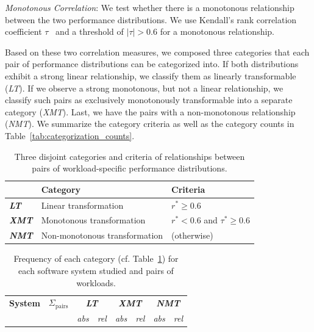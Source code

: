 {\begin{compactenum}
	\item \textit{Monotonous Correlation}: We test whether there is a monotonous relationship between the two performance distributions. We use Kendall's rank correlation coefficient $\tau$~\cite{kendall1938new} and a threshold of  $\vert\tau\vert > 0.6$ for a monotonous relationship.
\end{compactenum}
{\color{black}Based on these two correlation measures, we composed three categories that each pair of performance distributions can be categorized into.
If both distributions exhibit a strong linear relationship, we classify them as linearly transformable (\textit{\colorbox{lt-color!60}{LT}}). If we observe a strong monotonous, but not a linear relationship, we classify such pairs as exclusively monotonously transformable into a separate category (\textit{\colorbox{xmt-color!60}{XMT}}). Last, we have the pairs with a non-monotonous relationship  (\textit{\colorbox{nmt-color!60}{NMT}}). 
We summarize the category criteria as well as the category counts in Table~\ref{tab:categorization_counts}. 

\begin{table}
	\footnotesize
	\caption{Three disjoint categories and criteria of relationships between pairs of workload-specific performance distributions.}
	\centering
\begin{tabular}{lp{4.1cm}p{2.8cm}}	
	\toprule
	 \textbf{} & \textbf{Category} & \textbf{Criteria}\\
	 \midrule
	 \rowcolor{lt-color!40!white}\cellcolor{lt-color}\textit{\textbf{LT}} & {Linear transformation} & $r^* \geq 0.6$ \\
	\rowcolor{xmt-color!40!white}\cellcolor{xmt-color}\textit{\textbf{XMT}} & {Monotonous transformation} & $r^* < 0.6 $ and $ \tau^* \geq 0.6$ \\
	\rowcolor{nmt-color!40!white}\cellcolor{nmt-color}\textit{\textbf{NMT}} & {Non-monotonous transformation}  & (otherwise) \\%
	\bottomrule
\end{tabular}
\label{tab:categorization}
\end{table}

\begin{table}
	\footnotesize
	\centering
	\caption{Frequency of each category (cf. Table~\ref{tab:categorization}) for each software system studied and pairs of workloads.}
\begin{tabular}{p{1.1cm}rrrrrrr}	
	\toprule
	\textbf{System} & \textbf{$\Sigma_\text{pairs}$} & \multicolumn{2}{c}{\textbf{\cellcolor{lt-color}\textit{LT}}} & \multicolumn{2}{c}{\textbf{\cellcolor{xmt-color}\textit{XMT}}} & \multicolumn{2}{c}{\textbf{\cellcolor{nmt-color}\textit{NMT}}}\\
	  & & \textit{abs} &\textit{rel} & \textit{abs} & \textit{rel}& \textit{abs} & \textit{rel}\\
	\midrule
	

\end{tabular}
\end{table}}}
